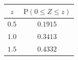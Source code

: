 {\setlength{\tabcolsep}{5pt}\renewcommand{\arraystretch}{1.25}%
\begin{tabular}{|c|c|}
\hline
$z$ & $\mathrm{P}(0\le Z\le z)$ \\
\hline
$0.5$ & $0.1915$ \\
\hline
$1.0$ & $0.3413$ \\
\hline
$1.5$ & $0.4332$ \\
\hline
\end{tabular}}
